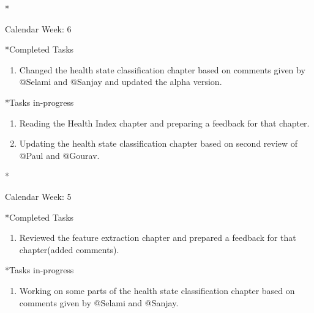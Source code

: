 \documentclass[11pt,a4paper]{article}
\begin{document}
\begin{section}*{Calendar Week: 6 \hfill \date{12 February, 2021}}
      \begin{subsection}*{Completed Tasks}
          \begin{enumerate}
              \item
                   Changed the health state classification chapter based on comments given by @Selami and @Sanjay and updated the alpha version.
          \end{enumerate}
      \end{subsection}
      
      \begin{subsection}*{Tasks in-progress}
          \begin{enumerate}
              \item
                  Reading the Health Index chapter and preparing a feedback for that chapter.
               \item    
                  Updating the health state classification chapter based on second review of @Paul and @Gourav.
            \end{enumerate}
      \end{subsection}
  \end{section}
\newpage
\begin{section}*{Calendar Week: 5 \hfill \date{5 February, 2021}}
      \begin{subsection}*{Completed Tasks}
          \begin{enumerate}
              \item
                  Reviewed the feature extraction  chapter and prepared a feedback for that chapter(added comments).
          \end{enumerate}
      \end{subsection}
      
      \begin{subsection}*{Tasks in-progress}
          \begin{enumerate}
              \item
                  Working on some parts of the health state classification chapter based on comments given by @Selami and @Sanjay.
          \end{enumerate}
      \end{subsection}
  \end{section}
  
\end{document}
